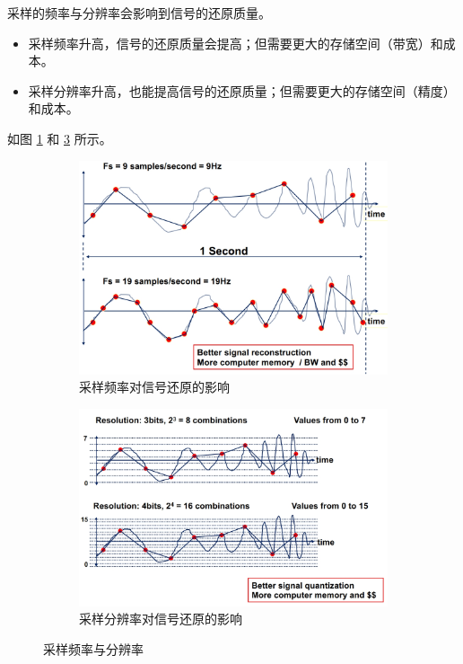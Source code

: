采样的频率与分辨率会影响到信号的还原质量。
\begin{itemize}
    \item 采样频率升高，信号的还原质量会提高；但需要更大的存储空间（带宽）和成本。
    \item 采样分辨率升高，也能提高信号的还原质量；但需要更大的存储空间（精度）和成本。
\end{itemize}
如图 \ref{fig:sampling-frequency} 和 \ref{fig:sampling-resolution} 所示。
\begin{figure}[H]
    \centering
    \begin{subfigure}{0.45\textwidth}
        \centering
        \includegraphics[width=\textwidth]{chap2/img/sampling-frequency.png}
        \caption{采样频率对信号还原的影响}
        \label{fig:sampling-frequency}
    \end{subfigure}
    \hfill
    \begin{subfigure}{0.45\textwidth}
        \centering
        \includegraphics[width=\textwidth]{chap2/img/sampling-resolution.png}
        \caption{采样分辨率对信号还原的影响}
        \label{fig:sampling-resolution}
    \end{subfigure}
    \caption{采样频率与分辨率}
\end{figure}

